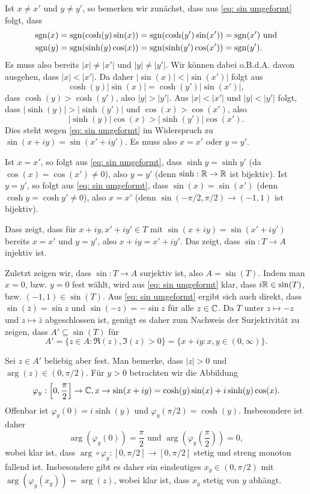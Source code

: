 \documentclass[a4paper,10pt]{article}
\begin{document}
Ist $x \neq x'$ und $y \neq y'$, so bemerken wir zunächst, dass aus \eqref{eq: sin umgeformt} folgt, dass
\begin{align*}
 \operatorname{sgn}(x) = \operatorname{sgn}(\cosh(y)\sin(x)) &= \operatorname{sgn}(\cosh(y')\sin(x')) = \operatorname{sgn}(x') \text{ und} \\
 \operatorname{sgn}(y) = \operatorname{sgn}(\sinh(y)\cos(x)) &= \operatorname{sgn}(\sinh(y')\cos(x')) = \operatorname{sgn}(y').
\end{align*}
Es muss also bereits $|x| \neq |x'|$ und $|y| \neq |y'|$. Wir können dabei o.B.d.A. davon ausgehen, dass $|x| < |x'|$. Da daher $|\sin(x)| < |\sin(x')|$ folgt aus
\[
 \cosh(y)|\sin(x)| = \cosh(y')|\sin(x')|,
\]
dass $\cosh(y) > \cosh(y')$, also $|y| > |y'|$. Aus $|x| < |x'|$ und $|y| < |y'|$ folgt, dass $|\sinh(y)| > |\sinh(y')|$ und $\cos(x) > \cos(x')$, also
\[
 |\sinh(y)|\cos(x) > |\sinh(y')|\cos(x').
\]
Dies steht wegen \eqref{eq: sin umgeformt} im Widerspruch zu $\sin(x+iy)=\sin(x'+iy')$. Es muss also $x = x'$ oder $y = y'$.

Ist $x = x'$, so folgt aus \eqref{eq: sin umgeformt}, dass $\sinh y  = \sinh y'$ (da $\cos(x) = \cos(x') \neq 0$), also $y = y'$ (denn $\sinh : \mathbb{R} \to \mathbb{R}$ ist bijektiv). Ist $y = y'$, so folgt aus \eqref{eq: sin umgeformt}, dass $\sin(x) = \sin(x')$ (denn $\cosh y = \cosh y' \neq 0$), also $x = x'$ (denn $\sin (-\pi/2,\pi/2) \to (-1,1)$ ist bijektiv).

Dass zeigt, dass für $x+iy, x'+iy' \in T$ mit $\sin(x+iy) = \sin(x'+iy')$ bereits $x=x'$ und $y=y'$, also $x+iy = x'+iy'$. Das zeigt, dass $\sin : T \to A$ injektiv ist.

Zuletzt zeigen wir, dass $\sin : T \to A$ surjektiv ist, also $A = \sin(T)$. Indem man $x=0$, bzw. $y=0$ fest wählt, wird aus \eqref{eq: sin umgeformt} klar, dass $i\mathbb{R} \in \sin(T)$, bzw. $(-1,1) \in \sin(T)$. Aus \eqref{eq: sin umgeformt} ergibt sich auch direkt, dass $\sin(\bar{z}) = \overline{\sin z}$ und $\sin(-z) = -\sin z$ für alle $z \in \mathbb{C}$. Da $T$ unter $z \mapsto -z$ und $z \mapsto \bar{z}$ abgeschlossen ist, genügt es daher zum Nachweis der Surjektivität zu zeigen, dass $A' \subseteq \sin(T)$ für
\[
 A' = \{z \in A : \Re(z), \Im(z) > 0\} = \{x+iy : x,y \in (0,\infty)\}.
\]

Sei $z \in A'$ beliebig aber fest. Man bemerke, dass $|z| > 0$ und $\arg(z) \in (0,\pi/2)$. Für $y > 0$ betrachten wir die Abbildung
\[
 \varphi_y : \left[0,\frac{\pi}{2}\right] \to \mathbb{C}, x \to \sin(x+iy) = \cosh(y)\sin(x)+i\sinh(y)\cos(x).
\]
Offenbar ist $\varphi_y(0) = i\sinh(y)$ und $\varphi_y(\pi/2) = \cosh(y)$. Insbesondere ist daher
\[
 \arg(\varphi_y(0)) = \frac{\pi}{2} \text{ und } \arg\left(\varphi_y\left(\frac{\pi}{2}\right)\right) = 0,
\]
wobei klar ist, dass $\arg \circ \varphi_y : [0,\pi/2] \to [0,\pi/2]$ stetig und streng monoton fallend ist. Insbesondere gibt es daher ein eindeutiges $x_y \in (0,\pi/2)$ mit $\arg(\varphi_y(x_y)) = \arg(z)$, wobei klar ist, dass $x_y$ stetig von $y$ abhängt.
\end{document}
